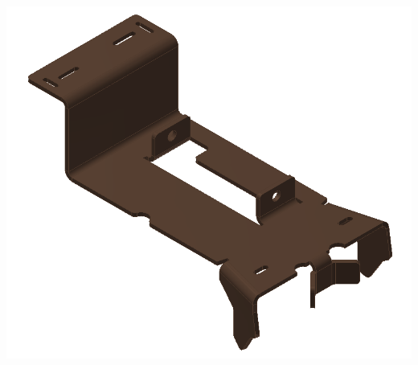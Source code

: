 
\begin{minipage}{\linewidth}
\begin{minipage}[c]{0.62\linewidth}
\includegraphics[width=\linewidth,valign=t]{images/CommercialBracket_model}
 \label{fig:results:stdbracketmodel}



\end{minipage}
\end{minipage}
